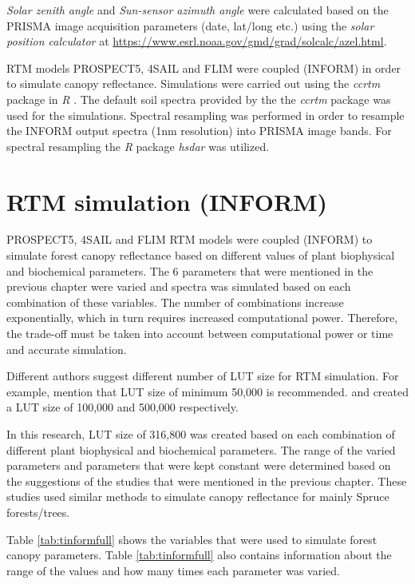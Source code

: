 \documentclass[a4paper, twoside]{templates/ociamthesis}
\begin{document}
\emph{Solar zenith angle} and \emph{Sun-sensor azimuth angle} were calculated based on the PRISMA image acquisition parameters (date, lat/long etc.) using the \emph{solar position calculator} at \url{https://www.esrl.noaa.gov/gmd/grad/solcalc/azel.html}.

RTM models PROSPECT5, 4SAIL and FLIM were coupled (INFORM) in order to simulate canopy reflectance. Simulations were carried out using the \emph{ccrtm} package \citep{ccrtm} in \emph{R} \citep{r}. The default soil spectra provided by the the \emph{ccrtm} package \citep{ccrtm} was used for the simulations. Spectral resampling was performed in order to resample the INFORM output spectra (1nm resolution) into PRISMA image bands. For spectral resampling the \emph{R} package \emph{hsdar} \citep{hsdar} was utilized.

\hypertarget{rtm-simulation-inform}{%
\section{RTM simulation (INFORM)}\label{rtm-simulation-inform}}

PROSPECT5, 4SAIL and FLIM RTM models were coupled (INFORM) to simulate forest canopy reflectance based on different values of plant biophysical and biochemical parameters. The 6 parameters that were mentioned in the previous chapter were varied and spectra was simulated based on each combination of these variables. The number of combinations increase exponentially, which in turn requires increased computational power. Therefore, the trade-off must be taken into account between computational power or time and accurate simulation.

Different authors suggest different number of LUT size for RTM simulation. For example, \citet{danner2021efficient} mention that LUT size of minimum 50,000 is recommended. \citet{ali2020machine} and \citet{darvishzadeh2019mapping} created a LUT size of 100,000 and 500,000 respectively.

In this research, LUT size of 316,800 was created based on each combination of different plant biophysical and biochemical parameters. The range of the varied parameters and parameters that were kept constant were determined based on the suggestions of the studies that were mentioned in the previous chapter. These studies used similar methods to simulate canopy reflectance for mainly Spruce forests/trees.

Table \ref{tab:tinformfull} shows the variables that were used to simulate forest canopy parameters. Table \ref{tab:tinformfull} also contains information about the range of the values and how many times each parameter was varied.
\end{document}
